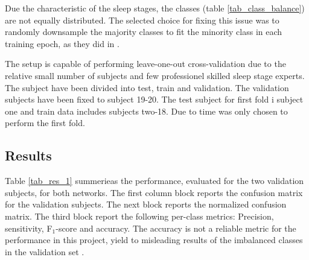 Due the characteristic of the sleep stages, the classes (table \ref{tab_class_balance}) are not equally distributed. The selected choice for fixing this issue was to randomly downsample the majority classes to fit the minority class in each training epoch, as they did in \cite{main_ar}. 

The setup is capable of performing leave-one-out cross-validation due to the relative small number of subjects and few professionel skilled sleep stage experts.
The subject have been divided into test, train and validation. The validation subjects have been fixed to subject 19-20. The test subject for first fold i subject one and train data includes subjects two-18. Due to time was only chosen to perform the first fold.

\subsection{Results}
\label{subsec:results}

Table \ref{tab_res_1} summerieas the performance, evaluated for the two validation subjects, for both networks. The first column block reports the confusion matrix for the validation subjects. The next block reports the normalized confusion matrix. The third block report the following per-class metrics: Precision, sensitivity, F$_1$-score and accuracy. The accuracy is not a reliable metric for the performance in this project, yield to misleading results of the imbalanced classes in the validation set \cite[sec. 11]{dl_book}.

